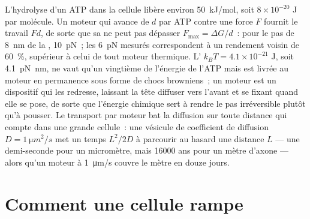 \begin{proposition}\label{prop:b3:cytoskeleton-motility:physics}
L'hydrolyse d'un ATP dans la cellule libère environ \qty{50}{kJ/mol},
soit $8\times 10^{-20}$ J par molécule. Un moteur qui avance de $d$ par
ATP contre une force $F$ fournit le travail $Fd$, de sorte que sa
\emph{} ne peut pas dépasser $F_{\max} = \Delta G/d$~:
pour le pas de \qty{8}{nm} de la , \qty{10}{pN}~; les
\qty{6}{pN} mesurés correspondent à un rendement voisin de
\qty{60}{\%}, supérieur à celui de tout moteur thermique. L' $k_{B}T =
4.1\times 10^{-21}$ J, soit \qty{4.1}{pN.nm}, ne vaut qu'un vingtième
de l'énergie de l'ATP mais est livrée au moteur en permanence sous
forme de chocs browniens~; un moteur est un dispositif qui les redresse,
laissant la tête diffuser vers l'avant et se fixant quand elle se pose,
de sorte que l'énergie chimique sert à rendre le pas irréversible
plutôt qu'à pousser. Le transport par moteur bat la diffusion sur toute
distance qui compte dans une grande cellule~: une vésicule de
coefficient de diffusion $D = \qty{1}{\micro
m^2/s}$ met un temps $L^{2}/2D$ à parcourir au hasard une distance $L$
--- une demi-seconde pour un micromètre, mais \num{16000} ans pour un
mètre d'axone --- alors qu'un moteur à \qty{1}{\micro m/s} couvre le
mètre en douze jours.
\end{proposition}
\admitted

\section{Comment une cellule rampe}

